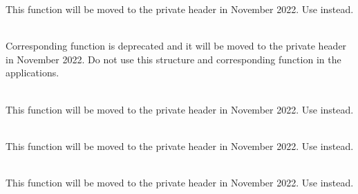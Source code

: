 \begin{DoxyRefList}
\label{deprecated__deprecated000006}%
%
This function will be moved to the private header in November 2022. Use  instead.  
\item[Member \doxylink{group__aps__management__service_gafb1c939dcef5ad2babe0b15e6d3395ec}{zb\+\_\+apsme\+\_\+binding\+\_\+req\+\_\+t} ]\hfill \\
\label{deprecated__deprecated000005}%
%
Corresponding function  is deprecated and it will be moved to the private header in November 2022. Do not use this structure and corresponding function in the applications.  
\item[Member \doxylink{group__aps__management__service_gae1bcb2c5762f695e9d401226e25000b1}{zb\+\_\+apsme\+\_\+remove\+\_\+all\+\_\+groups\+\_\+request} (\doxylink{group__base__types_gab70639e9bf73b53fe4a24b8fd4467082}{zb\+\_\+uint8\+\_\+t} param)]\hfill \\
\label{deprecated__deprecated000012}%
%
This function will be moved to the private header in November 2022. Use  instead. 
\item[Member \doxylink{group__aps__management__service_ga4bd755f958fa5a27c9b4dee166aa16bf}{zb\+\_\+apsme\+\_\+remove\+\_\+group\+\_\+request} (\doxylink{group__base__types_gab70639e9bf73b53fe4a24b8fd4467082}{zb\+\_\+uint8\+\_\+t} param)]\hfill \\
\label{deprecated__deprecated000011}%
%
This function will be moved to the private header in November 2022. Use  instead. 
\item[Member \doxylink{group__aps__management__service_ga320c027783f4599625596ccff828f1be}{zb\+\_\+apsme\+\_\+unbind\+\_\+all} (\doxylink{group__base__types_gab70639e9bf73b53fe4a24b8fd4467082}{zb\+\_\+uint8\+\_\+t} param)]\hfill \\
\label{deprecated__deprecated000008}%
%
This function will be moved to the private header in November 2022. Use  instead.  

\end{DoxyRefList}
